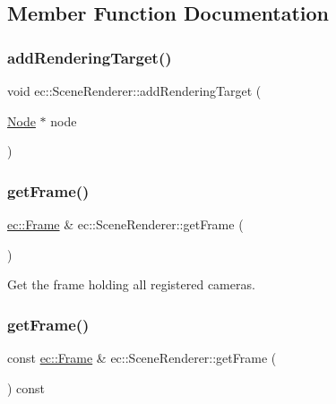 \subsection{Member Function Documentation}
\mbox{\label{classec_1_1_scene_renderer_a2d6d678c8e8cd9c068312a951cf8f33c}} 
\subsubsection{\texorpdfstring{add\+Rendering\+Target()}{addRenderingTarget()}}
{\footnotesize\ttfamily void ec\+::\+Scene\+Renderer\+::add\+Rendering\+Target (\begin{DoxyParamCaption}\item[{\mbox{\hyperlink{classec_1_1_node}{Node}} $\ast$}]{node }\end{DoxyParamCaption})}

\mbox{\label{classec_1_1_scene_renderer_a5e314c4d0e216f80e38d72792b0f81b1}} 
\subsubsection{\texorpdfstring{get\+Frame()}{getFrame()}\hspace{0.1cm}{\footnotesize\ttfamily [1/2]}}
{\footnotesize\ttfamily \mbox{\hyperlink{classec_1_1_frame}{ec\+::\+Frame}} \& ec\+::\+Scene\+Renderer\+::get\+Frame (\begin{DoxyParamCaption}{ }\end{DoxyParamCaption})}



Get the frame holding all registered cameras. 

\mbox{\label{classec_1_1_scene_renderer_a8d40b598152f261d0fb3bcfa829e26e9}} 
\subsubsection{\texorpdfstring{get\+Frame()}{getFrame()}\hspace{0.1cm}{\footnotesize\ttfamily [2/2]}}
{\footnotesize\ttfamily const \mbox{\hyperlink{classec_1_1_frame}{ec\+::\+Frame}} \& ec\+::\+Scene\+Renderer\+::get\+Frame (\begin{DoxyParamCaption}{ }\end{DoxyParamCaption}) const}



